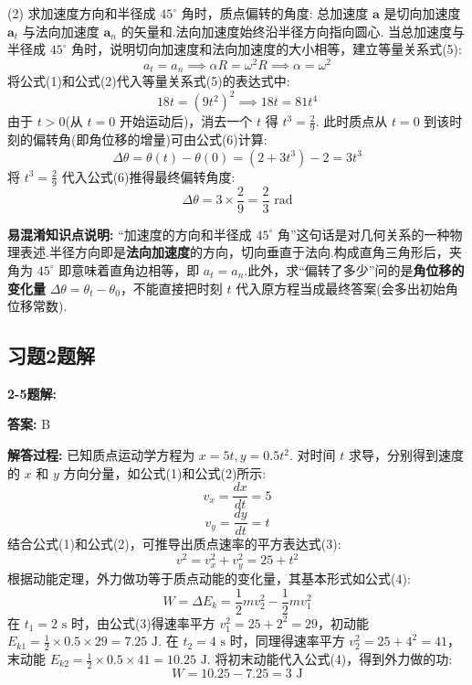 \begin{enumerate}
(2) 求加速度方向和半径成 $45^\circ$ 角时，质点偏转的角度:
总加速度 $\mathbf{a}$ 是切向加速度 $\mathbf{a}_t$ 与法向加速度 $\mathbf{a}_n$ 的矢量和.法向加速度始终沿半径方向指向圆心.
当总加速度与半径成 $45^\circ$ 角时，说明切向加速度和法向加速度的大小相等，建立等量关系式(5):
\begin{equation}
	a_t = a_n \implies \alpha R = \omega^2 R \implies \alpha = \omega^2
\end{equation}
将公式(1)和公式(2)代入等量关系式(5)的表达式中:
$$ 18t = (9t^2)^2 \implies 18t = 81t^4 $$
由于 $t > 0$(从 $t=0$ 开始运动后)，消去一个 $t$ 得 $t^3 = \frac{2}{9}$.
此时质点从 $t=0$ 到该时刻的偏转角(即角位移的增量)可由公式(6)计算:
\begin{equation}
	\Delta\theta = \theta(t) - \theta(0) = (2 + 3t^3) - 2 = 3t^3
\end{equation}
将 $t^3 = \frac{2}{9}$ 代入公式(6)推得最终偏转角度:
$$ \Delta\theta = 3 \times \frac{2}{9} = \frac{2}{3} \text{ rad} $$

\textbf{易混淆知识点说明:}
“加速度的方向和半径成 $45^\circ$ 角”这句话是对几何关系的一种物理表述.半径方向即是\textbf{法向加速度}的方向，切向垂直于法向.构成直角三角形后，夹角为 $45^\circ$ 即意味着直角边相等，即 $a_t = a_n$.此外，求“偏转了多少”问的是\textbf{角位移的变化量} $\Delta\theta = \theta_t - \theta_0$，不能直接把时刻 $t$ 代入原方程当成最终答案(会多出初始角位移常数).


\end{enumerate}

\newpage


\subsection{习题2题解}

\textbf{2-5题解:}

\textbf{答案:} B

\textbf{解答过程:}
已知质点运动学方程为 $x = 5t, y = 0.5t^2$.
对时间 $t$ 求导，分别得到速度的 $x$ 和 $y$ 方向分量，如公式(1)和公式(2)所示:
\begin{equation}
	v_x = \frac{dx}{dt} = 5
\end{equation}
\begin{equation}
	v_y = \frac{dy}{dt} = t
\end{equation}
结合公式(1)和公式(2)，可推导出质点速率的平方表达式(3):
\begin{equation}
	v^2 = v_x^2 + v_y^2 = 25 + t^2
\end{equation}
根据动能定理，外力做功等于质点动能的变化量，其基本形式如公式(4):
\begin{equation}
	W = \Delta E_k = \frac{1}{2}mv_2^2 - \frac{1}{2}mv_1^2
\end{equation}
在 $t_1 = 2\text{ s}$ 时，由公式(3)得速率平方 $v_1^2 = 25 + 2^2 = 29$，初动能 $E_{k1} = \frac{1}{2} \times 0.5 \times 29 = 7.25\text{ J}$.
在 $t_2 = 4\text{ s}$ 时，同理得速率平方 $v_2^2 = 25 + 4^2 = 41$，末动能 $E_{k2} = \frac{1}{2} \times 0.5 \times 41 = 10.25\text{ J}$.
将初末动能代入公式(4)，得到外力做的功:
$$W = 10.25 - 7.25 = 3\text{ J}$$

